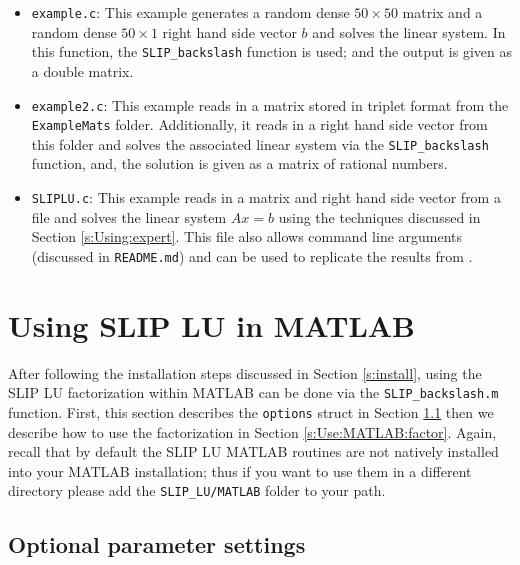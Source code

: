 \documentclass[12pt]{article}
\theoremstyle{definition}
\begin{document}
\begin{itemize}
\item \verb|example.c|: This example generates a random dense $50 \times 50$
matrix and a random dense $50 \times 1$ right hand side vector $b$ and
solves the linear system. In this function, the \verb|SLIP_backslash|
function is used; and the output is given as a double matrix.

\item \verb|example2.c|: This example reads in a matrix stored in triplet
format from the \verb|ExampleMats| folder. Additionally, it reads in a
right hand side vector from this folder and solves the associated linear system
via the \verb|SLIP_backslash| function, and, the solution is given as a matrix
of rational numbers.

\item \verb|SLIPLU.c|: This example reads in a matrix and right hand side
vector from a file and solves the linear system $A x = b$
using the techniques discussed in Section \ref{s:Using:expert}. This file also
allows command line arguments (discussed in \verb|README.md|) and can be used
to replicate the results from \cite{lourenco2019exact}.

\end{itemize}

\cprotect\section{Using SLIP LU in MATLAB}
\label{s:Use:MATLAB}

After following the installation steps discussed in Section \ref{s:install},
using the SLIP LU factorization within MATLAB can be done via the
\verb|SLIP_backslash.m| function. First, this section describes the \verb|options|
struct in Section \ref{s:Use:MATLAB:setup} then we describe how to use the
factorization in Section \ref{s:Use:MATLAB:factor}.  Again, recall that by
default the SLIP LU MATLAB routines are not natively installed into your MATLAB
installation; thus if you want to use them in a different directory please add
the \verb|SLIP_LU/MATLAB| folder to your path.

\cprotect\subsection{Optional parameter settings}
\label{s:Use:MATLAB:setup}
\end{document}
